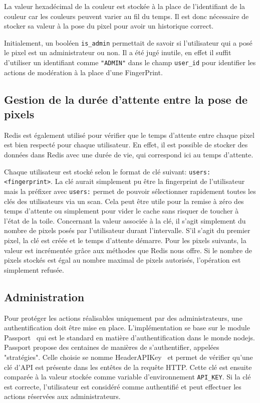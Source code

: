 La valeur hexadécimal de la couleur est stockée à la place de l'identifiant de la couleur car les couleurs peuvent varier au fil du temps. Il est donc nécessaire de stocker sa valeur à la pose du pixel pour avoir un historique correct.

Initialement, un booléen \texttt{is\_admin} permettait de savoir si l'utilisateur qui a posé le pixel est un administrateur ou non. Il a été jugé inutile, en effet il suffit d'utiliser un identifiant comme \texttt{"ADMIN"} dans le champ \texttt{user\_id} pour identifier les actions de modération à la place d'une FingerPrint.

\subsection{Gestion de la durée d'attente entre la pose de pixels}

Redis est également utilisé pour vérifier que le temps d'attente entre chaque pixel est bien respecté pour chaque utilisateur. En effet, il est possible de stocker des données dans Redis avec une durée de vie, qui correspond ici au temps d'attente.

Chaque utilisateur est stocké selon le format de clé suivant: \texttt{users:<fingerprint>}. La clé aurait simplement pu être la fingerprint de l'utilisateur mais la préfixer avec \texttt{users:} permet de pouvoir sélectionner rapidement toutes les clés des utilisateurs via un scan. Cela peut être utile pour la remise à zéro des temps d'attente ou simplement pour vider le cache sans risquer de toucher à l'état de la toile. Concernant la valeur associée à la clé, il s'agit simplement du nombre de pixels posés par l'utilisateur durant l'intervalle. S'il s'agit du premier pixel, la clé est créée et le temps d'attente démarre. Pour les pixels suivants, la valeur est incrémentée grâce aux méthodes que Redis nous offre. Si le nombre de pixels stockés est égal au nombre maximal de pixels autorisés, l'opération est simplement refusée.

\subsection{Administration}
\label{section:administration}

Pour protéger les actions réalisables uniquement par des administrateurs, une authentification doit être mise en place. L'implémentation se base sur le module Passport~\cite{passport} qui est le standard en matière d'authentification dans le monde \gls{nodejs}. Passport propose des centaines de manières de s'authentifier, appelées "stratégies". Celle choisie se nomme HeaderAPIKey~\cite{passport-headerapikey} et permet de vérifier qu'une clé d'API est présente dans les entêtes de la requête HTTP. Cette clé est ensuite comparée à la valeur stockée comme variable d'environnement \texttt{API_KEY}. Si la clé est correcte, l'utilisateur est considéré comme authentifié et peut effectuer les actions réservées aux administrateurs.

